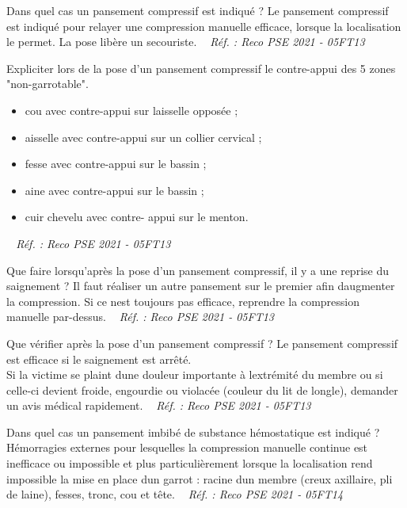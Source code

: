 \documentclass[grid,avery5371,landscape]{flashcards}
\makeatletter
\newcounter{nocarte}
\newcommand{\categ}[1]{%
  \def\@categ{#1}%
  \setcounter{nocarte}{0}%
}
\newcommand{\source}[1]{%
  \medskip
  \itshape%
   ~ \hfill Réf. : #1}
\makeatother
\begin{document}
\color[HTML]{003273}
\categ{PSE}
\begin{flashcard}[CAT]{
 Dans quel cas un pansement compressif est indiqué ?   }
  Le pansement compressif est indiqué pour relayer une compression manuelle efficace, lorsque la localisation le permet.
La pose libère un secouriste.
  \source{Reco PSE 2021 - 05FT13}
\end{flashcard}


\color[HTML]{003273}
\categ{PSE}
\begin{flashcard}[geste]{
 Expliciter lors de la pose d'un pansement compressif le contre-appui des 5 zones "non-garrotable".   }
  \begin{itemize}
\item cou avec contre-appui sur laisselle opposée ;
\item aisselle avec contre-appui sur un collier cervical ;
\item fesse avec contre-appui sur le bassin ;
\item aine avec contre-appui sur le bassin ;
\item cuir chevelu avec contre- appui sur le menton.
\end{itemize}
  \source{Reco PSE 2021 - 05FT13}
\end{flashcard}


\color[HTML]{003273}
\categ{PSE}
\begin{flashcard}[CAT]{
 Que faire lorsqu'après la pose d'un pansement compressif, il y a une reprise du saignement ?   }
  Il faut réaliser un autre pansement sur le premier afin daugmenter la compression. Si ce nest toujours pas efficace, reprendre la compression manuelle par-dessus.
  \source{Reco PSE 2021 - 05FT13}
\end{flashcard}


\color[HTML]{003273}
\categ{PSE}
\begin{flashcard}[CAT]{
 Que vérifier après la pose d'un pansement compressif ?   }
  Le pansement compressif est efficace si le saignement est arrêté. \\ Si la victime se plaint dune douleur importante à lextrémité du membre ou si celle-ci devient froide, engourdie ou violacée (couleur du lit de longle), demander un avis médical rapidement.
  \source{Reco PSE 2021 - 05FT13}
\end{flashcard}


\color[HTML]{003273}
\categ{PSE}
\begin{flashcard}[CAT]{
 Dans quel cas un pansement imbibé de substance hémostatique est indiqué ?   }
  Hémorragies externes pour lesquelles la compression manuelle continue est inefficace ou impossible et plus particulièrement lorsque la localisation rend impossible la mise en place dun garrot :
racine dun membre (creux axillaire, pli de laine),  fesses, tronc, cou et tête.
  \source{Reco PSE 2021 - 05FT14}
\end{flashcard}
\end{document}
